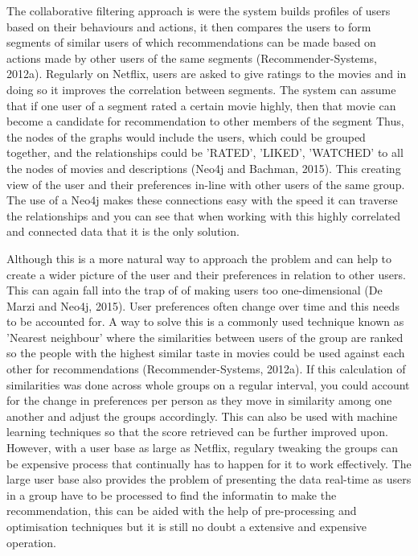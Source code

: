 \documentclass[a4paper]{article}
\begin{document}
The collaborative filtering approach is were the system builds profiles of users based on their behaviours and actions, it then compares the users to form segments of similar users of which recommendations can be made based on actions made by other users of the same segments (Recommender-Systems, 2012a). Regularly on Netflix, users are asked to give ratings to the movies and in doing so it improves the correlation between segments. The system can assume that if one user of a segment rated a certain movie highly, then that movie can become a candidate for recommendation to other members of the segment Thus, the nodes of the graphs would include the users, which could be grouped together, and the relationships could be 'RATED', 'LIKED', 'WATCHED' to all the nodes of movies and descriptions (Neo4j and Bachman, 2015). This creating view of the user and their preferences in-line with other users of the same group. The use of a Neo4j makes these connections easy with the speed it can traverse the relationships and you can see that when working with this highly correlated and connected data that it is the only solution. \par

Although this is a more natural way to approach the problem and can help to create a wider picture of the user and their preferences in relation to other users. This can again fall into the trap of of making users too one-dimensional (De Marzi and Neo4j, 2015). User preferences often change over time and this needs to be accounted for. A way to solve this is a commonly used technique known as 'Nearest neighbour' where the similarities between users of the group are ranked so the people with the highest similar taste in movies could be used against each other for recommendations (Recommender-Systems, 2012a). If this calculation of similarities was done across whole groups on a regular interval, you could account for the change in preferences per person as they move in similarity among one another and adjust the groups accordingly. This can also be used with machine learning techniques so that the score retrieved can be further improved upon. However, with a user base as large as Netflix, regulary tweaking the groups can be expensive process that continually has to happen for it to work effectively. The large user base also provides the problem of presenting the data real-time as users in a group have to be processed to find the informatin to make the recommendation, this can be aided with the help of pre-processing and optimisation techniques but it is still no doubt a extensive and expensive operation.
\end{document}

